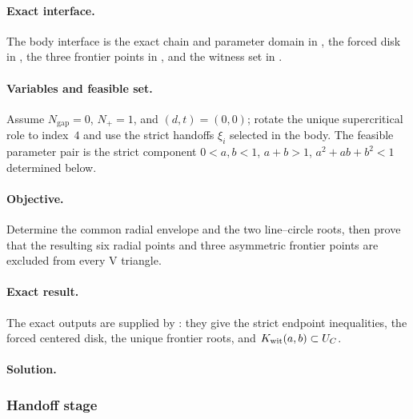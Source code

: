 \paragraph{Exact interface.}
The body interface is the exact chain and parameter domain in
,
the forced disk in , the three frontier points
in , and the witness set in
.

\paragraph{Variables and feasible set.}
Assume $N_{\mathrm{gap}}=0$, $N_+=1$, and $(d,t)=(0,0)$; rotate the unique
supercritical role to index~$4$ and use the strict handoffs $\xi_i$ selected
in the body.  The feasible parameter pair is the strict component
$0<a,b<1$, $a+b>1$, $a^2+ab+b^2<1$ determined below.

\paragraph{Objective.}
Determine the common radial envelope and the two line--circle roots, then
prove that the resulting six radial points and three asymmetric frontier
points are excluded from every V triangle.

\paragraph{Exact result.}
The exact outputs are supplied by
:
they give the strict endpoint inequalities, the forced centered disk, the
unique frontier roots, and $K_{\rm wit}(a,b)\subset U_C$.

\paragraph{Solution.}

\subsubsection*{Handoff stage}

